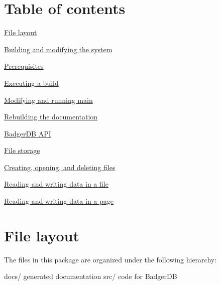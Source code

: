 \hypertarget{index_toc_sec}{}\section{Table of contents}\label{index_toc_sec}

\begin{DoxyEnumerate}
\item \hyperlink{index_file_layout_sec}{File layout} 
\item \hyperlink{index_building_sec}{Building and modifying the system} 
\begin{DoxyEnumerate}
\item \hyperlink{index_prereq_sec}{Prerequisites} 
\item \hyperlink{index_commands_sec}{Executing a build} 
\item \hyperlink{index_modify_run_main_sec}{Modifying and running main} 
\item \hyperlink{index_documentation_sec}{Rebuilding the documentation} 
\end{DoxyEnumerate}
\item \hyperlink{index_api_sec}{Badger\-D\-B A\-P\-I} 
\begin{DoxyEnumerate}
\item \hyperlink{index_storage_sec}{File storage} 
\begin{DoxyEnumerate}
\item \hyperlink{index_file_management_sec}{Creating, opening, and deleting files} 
\item \hyperlink{index_file_data_sec}{Reading and writing data in a file} 
\item \hyperlink{index_page_sec}{Reading and writing data in a page} 
\end{DoxyEnumerate}
\end{DoxyEnumerate}
\end{DoxyEnumerate}\hypertarget{index_file_layout_sec}{}\section{File layout}\label{index_file_layout_sec}
The files in this package are organized under the following hierarchy\-: 
\begin{DoxyPre}
docs/                  generated documentation
src/                   code for BadgerDB
\end{DoxyPre}


